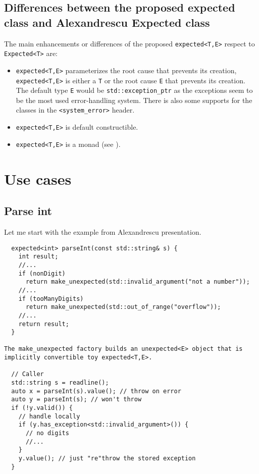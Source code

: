 \documentclass[a4paper,10pt]{article}
\newcommand{\cpp}[1]{\lstinline{#1}}
\begin{document}
\subsection{Differences between the proposed expected class and Alexandrescu Expected class}

The main enhancements or differences of the proposed \cpp{expected<T,E>} respect to \cpp{Expected<T>} are:
\begin{itemize}
 \item \cpp{expected<T,E>} parameterizes the root cause that prevents its creation, \cpp{expected<T,E>} is either a \cpp{T} or the root cause \cpp{E} that prevents its creation. The default type \cpp{E} would be \cpp{std::exception_ptr} as the exceptions seem to be the most used error-handling system. There is also some supports for the classes in the \cpp{<system_error>} header.
 \item \cpp{expected<T,E>} is default constructible.
 \item \cpp{expected<T,E>} is a monad (see \cite{MONAD}).
\end{itemize}

\section{Use cases}

\subsection{Parse int}

Let me start with the example from Alexandrescu presentation.

\begin{lstlisting}
  expected<int> parseInt(const std::string& s) {
    int result;
    //...
    if (nonDigit)  
      return make_unexpected(std::invalid_argument("not a number"));
    //...
    if (tooManyDigits) 
      return make_unexpected(std::out_of_range("overflow"));
    //...
    return result;
  }

The make_unexpected factory builds an unexpected<E> object that is implicitly convertible toy expected<T,E>.

  // Caller
  std::string s = readline();
  auto x = parseInt(s).value(); // throw on error
  auto y = parseInt(s); // won't throw
  if (!y.valid()) {
    // handle locally
    if (y.has_exception<std::invalid_argument>()) {
      // no digits
      //...
    }
    y.value(); // just "re"throw the stored exception
  }
\end{lstlisting}
\end{document}
